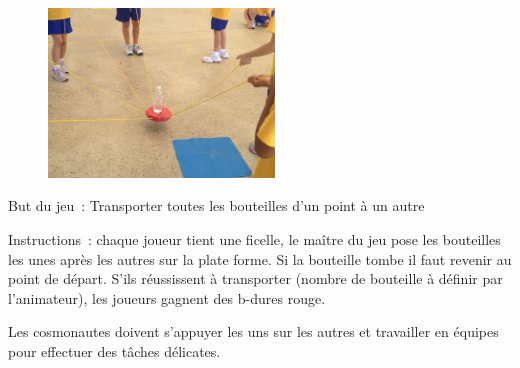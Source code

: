 \documentclass{grand-jeu}
\begin{document}
\begin{liste-materiel}
\end{liste-materiel}

\begin{regles}
\begin{figure}
\vspace{-1cm}
\includegraphics[width=6cm]{4-Solidaire-rouge/sources/81.jpg}
\end{figure}

But du jeu : Transporter toutes les bouteilles d’un point à un autre

\vspace{0.2cm}

Instructions : chaque joueur tient une ficelle, le maître du jeu pose les bouteilles les unes après les autres sur la plate forme. Si la bouteille tombe il faut revenir au point de départ.
S'ils réussissent à transporter (nombre de bouteille à définir par l'animateur), les joueurs gagnent des b-dures rouge. 
\end{regles}

\begin{imaginaire}
Les cosmonautes doivent s'appuyer les uns sur les autres et travailler en équipes pour effectuer des tâches délicates. 
\end{imaginaire}

\begin{moments-stop}
\end{moments-stop}
\end{document}

